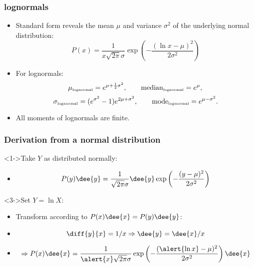 \begin{frame}
  \frametitle{lognormals}

  \begin{block}{}
  \begin{itemize}
  \item<1-> 
    Standard form reveals the mean $\mu$ and
    variance $\sigma^2$ of the underlying 
    normal distribution:
    $$
    P(x) = \frac{1}{x \sqrt{2\pi} \sigma}
    \exp 
    \left(
      -\frac{(\ln x-\mu)^2}
      {2\sigma^2}
    \right)
    $$
  \item<2->
    For lognormals:
    $$
    \mu_{\mbox{\tiny lognormal}} = e^{\mu+\frac{1}{2}\sigma^2},
    \qquad
    \mbox{median}_{\mbox{\tiny lognormal}} = e^{\mu},
    $$
    $$
    \sigma_{\mbox{\tiny lognormal}} = (e^{\sigma^2} - 1 ) e^{2\mu + \sigma^2},
    \qquad
    \mbox{mode}_{\mbox{\tiny lognormal}} = e^{\mu-\sigma^2}.
    $$
  \item<3->
    All moments of lognormals are \alert{finite}.
  \end{itemize}
  \end{block}

\end{frame}

\begin{frame}
  \frametitle{Derivation from a normal distribution}

  \begin{block}<1->{Take $Y$ as distributed normally:}
    \begin{itemize}
    \item<2->
      $$
      P(y)\dee{y} = \frac{1}{\sqrt{2\pi} \sigma} \dee{y}
      \exp 
      \left(
        -\frac{(y-\mu)^2}
        {2\sigma^2}
      \right)
      $$
    \end{itemize}
  \end{block}

  \begin{block}<3->{Set $Y = \ln X$:}
    \begin{itemize}
    \item<4-> Transform according to $P(x) \dee{x} = P(y) \dee{y}$:
    \item<5->
      $$
      \diff{y}{x} = 1/x \Rightarrow \dee{y} = \dee{x} / x
      $$
    \item<6->
      $$
      \Rightarrow P(x) \dee{x} 
      = \frac{1}{\alert{x} \sqrt{2\pi} \sigma} 
      \exp 
      \left(
        -\frac{(\alert{\ln x}-\mu)^2}
        {2\sigma^2}
      \right)
      \dee{x}
      $$
    \end{itemize}
  \end{block}

\end{frame}

